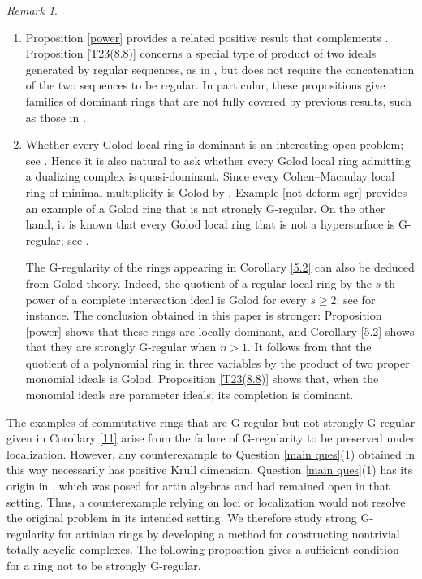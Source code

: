 \documentclass{amsart}
\theoremstyle{definition}
\theoremstyle{remark}
\newtheorem{rem}[thm]{Remark}
\numberwithin{equation}{thm}
\def\ge{\geqslant}
\begin{document}
\begin{rem}
\begin{enumerate}[(1)]
\item Proposition \ref{power} provides a related positive result that complements \cite[Proposition 7.7]{T23}. Proposition \ref{T23(8.8)} concerns a special type of product of two ideals generated by regular sequences, as in \cite[Proposition 8.8]{T23}, but does not require the concatenation of the two sequences to be regular. In particular, these propositions give families of dominant rings that are not fully covered by previous results, such as those in \cite{T23,KT}.

\item Whether every Golod local ring is dominant is an interesting open problem; see \cite[Question 9.4]{T23}. Hence it is also natural to ask whether every Golod local ring admitting a dualizing complex is quasi-dominant. Since every Cohen--Macaulay local ring of minimal multiplicity is Golod by \cite[Example 5.2.8]{Avr}, Example \ref{not deform sgr} provides an example of a Golod ring that is not strongly G-regular. On the other hand, it is known that every Golod local ring that is not a hypersurface is G-regular; see \cite[Examples 3.5]{AM}. 

The G-regularity of the rings appearing in Corollary \ref{5.2} can also be deduced from Golod theory. Indeed, the quotient of a regular local ring by the $s$-th power of a complete intersection ideal is Golod for every $s\ge2$; see \cite[Corollary 3.3]{GS} for instance. The conclusion obtained in this paper is stronger: Proposition \ref{power} shows that these rings are locally dominant, and Corollary \ref{5.2} shows that they are strongly G-regular when $n>1$. It follows from \cite[Corollary 1.2]{DDS22} that the quotient of a polynomial ring in three variables by the product of two proper monomial ideals is Golod. Proposition \ref{T23(8.8)} shows that, when the monomial ideals are parameter ideals, its completion is dominant.
\end{enumerate}
\end{rem}

The examples of commutative rings that are G-regular but not strongly G-regular given in Corollary \ref{11} arise from the failure of G-regularity to be preserved under localization. However, any counterexample to Question \ref{main ques}(1) obtained in this way necessarily has positive Krull dimension. Question \ref{main ques}(1) has its origin in \cite[Problem C]{Che17}, which was posed for artin algebras and had remained open in that setting. Thus, a counterexample relying on loci or localization would not resolve the original problem in its intended setting. We therefore study strong G-regularity for artinian rings by developing a method for constructing nontrivial totally acyclic complexes. The following proposition gives a sufficient condition for a ring not to be strongly G-regular.
\end{document}

